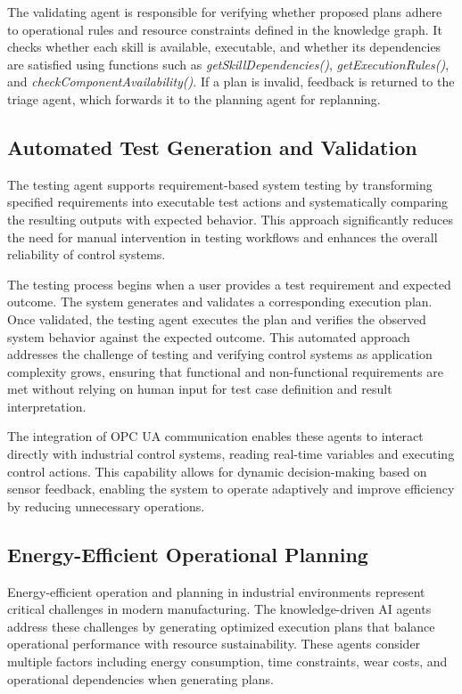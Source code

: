 The validating agent is responsible for verifying whether proposed plans adhere to operational rules and resource constraints defined in the knowledge graph. It checks whether each skill is available, executable, and whether its dependencies are satisfied using functions such as \textit{getSkillDependencies()}, \textit{getExecutionRules()}, and \textit{checkComponentAvailability()}. If a plan is invalid, feedback is returned to the triage agent, which forwards it to the planning agent for replanning.

\subsection{Automated Test Generation and Validation}

The testing agent supports requirement-based system testing by transforming specified requirements into executable test actions and systematically comparing the resulting outputs with expected behavior. This approach significantly reduces the need for manual intervention in testing workflows and enhances the overall reliability of control systems.

The testing process begins when a user provides a test requirement and expected outcome. The system generates and validates a corresponding execution plan. Once validated, the testing agent executes the plan and verifies the observed system behavior against the expected outcome. This automated approach addresses the challenge of testing and verifying control systems as application complexity grows, ensuring that functional and non-functional requirements are met without relying on human input for test case definition and result interpretation.

The integration of OPC UA communication enables these agents to interact directly with industrial control systems, reading real-time variables and executing control actions. This capability allows for dynamic decision-making based on sensor feedback, enabling the system to operate adaptively and improve efficiency by reducing unnecessary operations.

\subsection{Energy-Efficient Operational Planning}

Energy-efficient operation and planning in industrial environments represent critical challenges in modern manufacturing. The knowledge-driven AI agents address these challenges by generating optimized execution plans that balance operational performance with resource sustainability. These agents consider multiple factors including energy consumption, time constraints, wear costs, and operational dependencies when generating plans.

